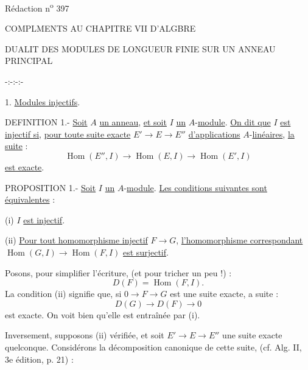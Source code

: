 Rédaction n\textsuperscript{o} 397

COMPLMENTS AU CHAPITRE VII D'ALGBRE

DUALIT DES MODULES DE LONGUEUR FINIE SUR UN ANNEAU PRINCIPAL

\begin{center}-:-:-:-\end{center}

1. \uline{Modules injectifs}.

DEFINITION 1.- \uline{Soit} $A$ \uline{un anneau}, \uline{et soit} $I$ \uline{un} $A$-\uline{module}. \uline{On dit que} $I$ \uline{est injectif si}, \uline{pour toute suite exacte} $E'\longrightarrow E\longrightarrow E''$ \uline{d'applications} $A$-\uline{linéaires}, \uline{la suite} :
\[
\operatorname{Hom}(E'',I)\longrightarrow\operatorname{Hom}(E,I)\longrightarrow\operatorname{Hom}(E',I)
\]
\uline{est exacte}.

PROPOSITION 1.- \uline{Soit} $I$ \uline{un} $A$-\uline{module}. \uline{Les conditions suivantes sont équivalentes} :

(i) \quad $I$ \uline{est injectif}.

(ii) \quad \uline{Pour tout homomorphisme injectif} $F\longrightarrow G$, \uline{l'homomorphisme correspondant} $\operatorname{Hom}(G,I)\longrightarrow\operatorname{Hom}(F,I)$ \uline{est surjectif}.

Posons, pour simplifier l'écriture, (et pour tricher un peu !) :
\[
D(F)=\operatorname{Hom}(F,I).
\]
La condition (ii) signifie que, si $0\longrightarrow F\longrightarrow G$ est une suite exacte, a suite :
\[
D(G)\longrightarrow D(F)\longrightarrow 0
\]
est exacte. On voit bien qu'elle est entraînée par (i).

Inversement, supposons (ii) vérifiée, et soit $E'\longrightarrow E\longrightarrow E''$ une suite exacte quelconque. Considérons la décomposition canonique de cette suite, (cf. Alg. II, 3e édition, p. 21) :

